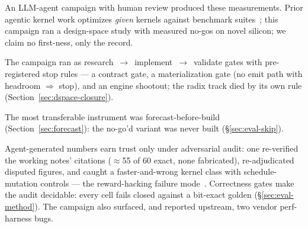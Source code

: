 An LLM-agent campaign with human review produced these measurements.
Prior agentic kernel work
optimizes \emph{given} kernels against benchmark
suites~\cite{ouyang2025kernelbench,sakana2025aicuda,accelopt2025,kforge2025,peak2025};
this campaign ran a design-space study with measured no-gos on novel
silicon; we claim no first-ness, only the record.


The campaign ran as research~$\rightarrow$~implement~$\rightarrow$~validate
gates with pre-registered stop rules --- a contract gate, a
materialization gate (no emit path with
headroom $\Rightarrow$ stop), and an engine shootout; the radix track
died by its own rule (Section~\ref{sec:dspace-closure}).

The most transferable instrument was forecast-before-build
(Section~\ref{sec:forecast}): the no-go'd variant was never built
(\S\ref{sec:eval-skip}).

Agent-generated numbers earn trust only under adversarial audit: one
re-verified the working notes' citations
($\approx$55 of 60 exact, none fabricated), re-adjudicated disputed
figures, and caught a
faster-and-wrong kernel class with schedule-mutation controls --- the
reward-hacking failure mode~\cite{sakana2025aicuda}. Correctness gates
make the audit decidable:
every cell fails closed against a bit-exact golden
(\S\ref{sec:eval-method}). The
campaign also surfaced, and reported upstream, two vendor perf-harness
bugs.

